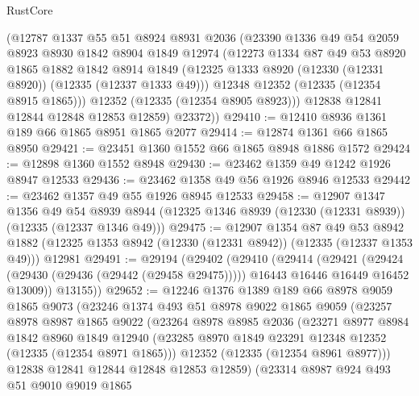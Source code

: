 \begin{lexlean}{RustCore}
\begin{coremodule}
        (@12787
          @1337
          @55
          @51
          @8924
          @8931
          @2036
          (@23390
            @1336
            @49
            @54
            @2059
            @8923
            @8930
            @1842
            @8904
            @1849
            @12974
            (@12273
              @1334
              @87
              @49
              @53
              @8920
              @1865
              @1882
              @1842
              @8914
              @1849
              (@12325 @1333 @8920 (@12330 (@12331 @8920)) (@12335 (@12337 @1333 @49)))
              @12348
              @12352
              (@12335 (@12354 @8915 @1865)))
            @12352
            (@12335 (@12354 @8905 @8923)))
          @12838
          @12841
          @12844
          @12848
          @12853
          @12859)
        @23372))
@29410 := @12410 @8936 @1361 @189 @66 @1865 @8951 @1865 @2077
@29414 := @12874 @1361 @66 @1865 @8950
@29421 := @23451 @1360 @1552 @66 @1865 @8948 @1886 @1572
@29424 := @12898 @1360 @1552 @8948
@29430 := @23462 @1359 @49 @1242 @1926 @8947 @12533
@29436 := @23462 @1358 @49 @56 @1926 @8946 @12533
@29442 := @23462 @1357 @49 @55 @1926 @8945 @12533
@29458 := @12907
    @1347
    @1356
    @49
    @54
    @8939
    @8944
    (@12325 @1346 @8939 (@12330 (@12331 @8939)) (@12335 (@12337 @1346 @49)))
@29475 := @12907
    @1354
    @87
    @49
    @53
    @8942
    @1882
    (@12325 @1353 @8942 (@12330 (@12331 @8942)) (@12335 (@12337 @1353 @49)))
    @12981
@29491 := @29194
    (@29402
      (@29410
        (@29414
          (@29421
            (@29424 (@29430 (@29436 (@29442 (@29458 @29475)))))
            @16443
            @16446
            @16449
            @16452
            @13009))
        @13155))
@29652 := @12246
    @1376
    @1389
    @189
    @66
    @8978
    @9059
    @1865
    @9073
    (@23246
      @1374
      @493
      @51
      @8978
      @9022
      @1865
      @9059
      (@23257
        @8978
        @8987
        @1865
        @9022
        (@23264
          @8978
          @8985
          @2036
          (@23271
            @8977
            @8984
            @1842
            @8960
            @1849
            @12940
            (@23285 @8970 @1849 @23291 @12348 @12352 (@12335 (@12354 @8971 @1865)))
            @12352
            (@12335 (@12354 @8961 @8977)))
          @12838
          @12841
          @12844
          @12848
          @12853
          @12859)
        (@23314
          @8987
          @924
          @493
          @51
          @9010
          @9019
          @1865

\end{coremodule}
\end{lexlean}
